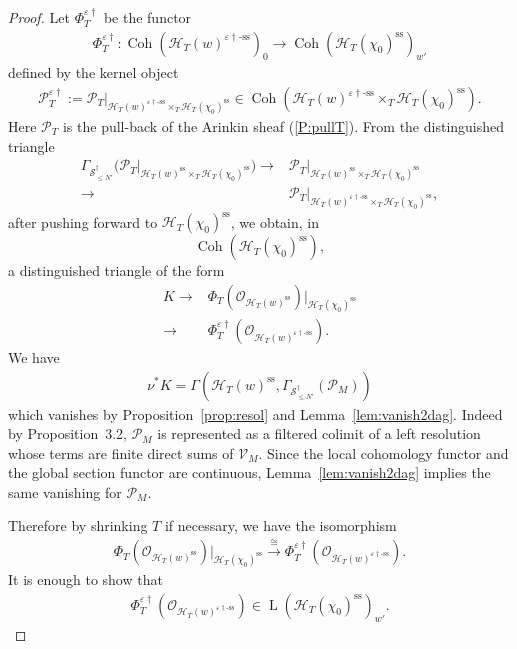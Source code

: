 \documentclass[11pt,oneside,a4paper,mathscr]{amsart}
\theoremstyle{definition}
\renewcommand{\leq}{\leqslant}
\newcommand{\cS}{\mathcal{S}}
\newcommand{\LL}{\operatorname{L}}
\newcommand{\cH}{\mathcal{H}}
\newcommand{\cP}{\mathcal{P}}
\newcommand{\Coh}{\operatorname{Coh}}
\newcommand{\vd}{\varepsilon\dag}
\begin{document}
\begin{proof}
Let $\Phi_T^{\varepsilon\dag}$ be the functor 
\begin{align*}
  \Phi_T^{\varepsilon\dag}\colon \Coh(\cH_T(w)^{\varepsilon\dag\text{-ss}})_0 \to 
  \Coh(\cH_T(\chi_0)^{\mathrm{ss}})_{w'}
\end{align*}
defined by the kernel object 
\begin{align}\label{PTvd}
\cP_T^{\vd}:=
    \mathcal{P}_T|_{\cH_T(w)^{\varepsilon\dag\text{-ss}}\times_T \cH_T(\chi_0)^{\text{ss}}} \in \Coh(\cH_T(w)^{\varepsilon\dag\text{-ss}}\times_T \cH_T(\chi_0)^{\text{ss}}).
\end{align}
Here $\cP_T$ is the pull-back of the Arinkin sheaf (\ref{P:pullT}). 
From the distinguished triangle 
\begin{align*}
\Gamma_{\cS^{\dag}_{\leq N'}}
\bigl(\mathcal{P}_T|_{\cH_T(w)^{\text{ss}}\times_T \cH_T(\chi_0)^{\text{ss}}}\bigr)
\to {}& \mathcal{P}_T|_{\cH_T(w)^{\text{ss}}\times_T \cH_T(\chi_0)^{\text{ss}}} \\
\to {}& \mathcal{P}_T|_{\cH_T(w)^{\varepsilon\dag\text{-ss}}\times_T
\cH_T(\chi_0)^{\text{ss}}},
\end{align*}
after pushing forward to $\cH_T(\chi_0)^{\mathrm{ss}}$, we obtain, in
\[
\Coh(\cH_T(\chi_0)^{\mathrm{ss}}),
\]
a distinguished triangle of the form
\begin{align*}
K\to {}&
\Phi_T(\mathcal{O}_{\cH_T(w)^{\mathrm{ss}}})|_{\cH_T(\chi_0)^{\text{ss}}} \\
\to {}&
\Phi_T^{\varepsilon\dag}(\mathcal{O}_{\cH_T(w)^{\varepsilon\dag\text{-ss}}}). 
\end{align*}
We have 
\begin{align*}
    \nu^* K=\Gamma(\cH_T(w)^{\mathrm{ss}}, \Gamma_{\cS_{\leq N'}^{\dag}}(\cP_M))
\end{align*}
which vanishes by Proposition~\ref{prop:resol} and Lemma~\ref{lem:vanish2dag}. 
Indeed by Proposition~3.2, $\cP_M$ is represented as a filtered colimit of a left
resolution whose terms are finite direct sums of $\mathcal{V}_M$. Since
the local cohomology functor and the global section functor are continuous, Lemma~\ref{lem:vanish2dag} implies the same vanishing for
$\cP_M$. 

Therefore by shrinking $T$ if necessary, we have the isomorphism 
\begin{align}\label{PhiTdag1}
\Phi_T(\mathcal{O}_{\cH_T(w)^{\mathrm{ss}}})|_{\cH_T(\chi_0)^{\text{ss}}} \stackrel{\cong}{\to} 
     \Phi_T^{\varepsilon\dag}(\mathcal{O}_{\cH_T(w)^{\varepsilon\dag\text{-ss}}}).
\end{align}
It is enough to show that 
\begin{align}\label{show:dag}
  \Phi_T^{\varepsilon\dag}(\mathcal{O}_{\cH_T(w)^{\varepsilon\dag\text{-ss}}}) \in \LL(\cH_T(\chi_0)^{\mathrm{ss}})_{w'}.   
\end{align}


\end{proof}
\end{document}
